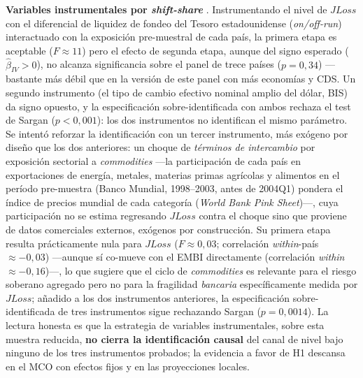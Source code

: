 \textbf{Variables instrumentales por \textit{shift-share}} \citep{GoldsmithPinkhamSorkinSwift2020}. Instrumentando el nivel de $JLoss$ con el diferencial de liquidez de fondeo del Tesoro estadounidense (\textit{on/off-run}) interactuado con la exposición pre-muestral de cada país, la primera etapa es aceptable ($F\approx11$) pero el efecto de segunda etapa, aunque del signo esperado ($\hat\beta_{IV}>0$), no alcanza significancia sobre el panel de trece países ($p=0{,}34$) —bastante más débil que en la versión de este panel con más economías y CDS. Un segundo instrumento (el tipo de cambio efectivo nominal amplio del dólar, BIS) da signo opuesto, y la especificación sobre-identificada con ambos rechaza el test de Sargan ($p<0{,}001$): los dos instrumentos no identifican el mismo parámetro. Se intentó reforzar la identificación con un tercer instrumento, más exógeno por diseño que los dos anteriores: un choque de \emph{términos de intercambio} por exposición sectorial a \textit{commodities} —la participación de cada país en exportaciones de energía, metales, materias primas agrícolas y alimentos en el período pre-muestra (Banco Mundial, 1998--2003, antes de 2004Q1) pondera el índice de precios mundial de cada categoría (\textit{World Bank Pink Sheet})—, cuya participación no se estima regresando $JLoss$ contra el choque sino que proviene de datos comerciales externos, exógenos por construcción. Su primera etapa resulta prácticamente nula para $JLoss$ ($F\approx0{,}03$; correlación \textit{within}-país $\approx-0{,}03$) —aunque sí co-mueve con el EMBI directamente (correlación \textit{within} $\approx-0{,}16$)—, lo que sugiere que el ciclo de \textit{commodities} es relevante para el riesgo soberano agregado pero no para la fragilidad \emph{bancaria} específicamente medida por $JLoss$; añadido a los dos instrumentos anteriores, la especificación sobre-identificada de tres instrumentos sigue rechazando Sargan ($p=0{,}0014$). La lectura honesta es que la estrategia de variables instrumentales, sobre esta muestra reducida, \textbf{no cierra la identificación causal} del canal de nivel bajo ninguno de los tres instrumentos probados; la evidencia a favor de H1 descansa en el MCO con efectos fijos y en las proyecciones locales.

